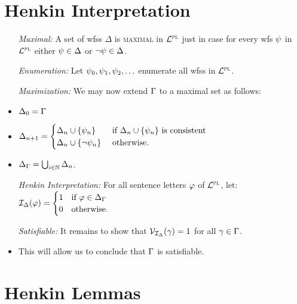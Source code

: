 \documentclass[a4paper, 11pt]{article} %
\begin{document}
\section*{Henkin Interpretation}

\begin{itemize}
  \item[\it Maximal:] A set of wfss $\Delta$ is \textsc{maximal} in $\mathcal{L}^{\textsc{pl}}$ just in case for every wfs $\psi$ in $\mathcal{L}^{\textsc{pl}}$ either $\psi\in\Delta$ or $\neg\psi\in\Delta$.
  \item[\it Enumeration:] Let $\psi_0,\psi_1,\psi_2,\ldots$ enumerate all wfss in $\mathcal{L}^{\textsc{pl}}$.
  \item[\it Maximization:] We may now extend $\Gamma$ to a maximal set as follows: 
    \item $\Delta_0 = \Gamma$
    \item $\Delta_{n+1} =
      \begin{cases}
        \Delta_n\cup\lbrace\psi_n\rbrace      & \text{ if } \Delta_n\cup\lbrace\psi_n\rbrace \text{ is consistent}\\
        \Delta_n\cup\lbrace\neg\psi_n\rbrace  & \text{ otherwise}.
      \end{cases}$
    \item $\Delta_{\Gamma} = \bigcup_{i\in\mathbb{N}}\Delta_n$. 
  \item[\it Henkin Interpretation:] For all sentence letters $\varphi$ of $\mathcal{L}^{\textsc{pl}}$, let:~~ $\mathcal{I}_{\Delta}(\varphi) = 
    \begin{cases}
      1 & \text{if } \varphi \in \Delta_{\Gamma}\\
      0 & \text{otherwise.}
    \end{cases}$
  \item[\it Satisfiable:] It remains to show that $\mathcal{V}_{\mathcal{I}_{\Delta}}(\gamma) = 1$ for all $\gamma \in \Gamma$. 
    \item This will allow us to conclude that $\Gamma$ is satisfiable.  
\end{itemize}





\section*{Henkin Lemmas}
\end{document}
